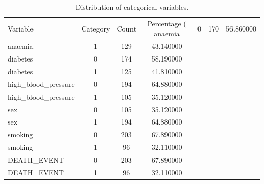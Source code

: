 \begin{table}
\caption{Distribution of categorical variables.}
\label{tab:categorical_stats}
\begin{tabular}{lccc}
\toprule
Variable & Category & Count & Percentage (%
\midrule
anaemia & 0 & 170 & 56.860000 \\
anaemia & 1 & 129 & 43.140000 \\
diabetes & 0 & 174 & 58.190000 \\
diabetes & 1 & 125 & 41.810000 \\
high_blood_pressure & 0 & 194 & 64.880000 \\
high_blood_pressure & 1 & 105 & 35.120000 \\
sex & 0 & 105 & 35.120000 \\
sex & 1 & 194 & 64.880000 \\
smoking & 0 & 203 & 67.890000 \\
smoking & 1 & 96 & 32.110000 \\
DEATH_EVENT & 0 & 203 & 67.890000 \\
DEATH_EVENT & 1 & 96 & 32.110000 \\
\bottomrule
\end{tabular}
\end{table}
